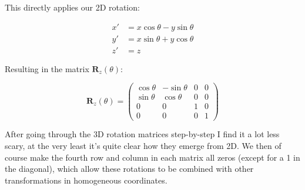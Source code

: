 \documentclass[12pt]{article}
\begin{document}
This directly applies our 2D rotation:

$$
    \begin{aligned}
        x' & = x \cos\theta - y \sin\theta \\
        y' & = x \sin\theta + y \cos\theta \\
        z' & = z
    \end{aligned}
$$

Resulting in the matrix $\mathbf{R}_z(\theta)$:

$$
    \mathbf{R}_z(\theta) = \begin{pmatrix}
        \cos\theta & -\sin\theta & 0 & 0 \\
        \sin\theta & \cos\theta  & 0 & 0 \\
        0          & 0           & 1 & 0 \\
        0          & 0           & 0 & 1
    \end{pmatrix}
$$

After going through the 3D rotation matrices step-by-step I find it a lot less scary, at the very least it's quite clear how they emerge from 2D.
We then of course make the fourth row and column in each matrix all zeros (except for a 1 in the diagonal), which allow these rotations to be combined with other transformations in homogeneous coordinates.
\end{document}
